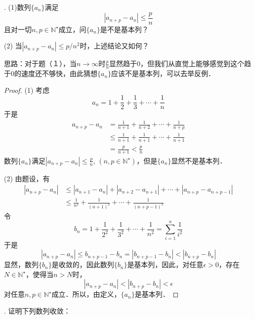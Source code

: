 \documentclass{ctexart}
\theoremstyle{definition}
\theoremstyle{definition}
\theoremstyle{plain}
\theoremstyle{plain}
\theoremstyle{plain}
\theoremstyle{definition}
\begin{document}
. (1)数列$\{a_n\}$满足
\begin{equation}
    |a_{n+p}-a_n|\leq\frac{p}{n}
\end{equation}
且对一切$n,p\in\mathbb{N}^\star$成立，问$\{ a_n\}$是不是基本列？

\noindent (2) 当$|a_{n+p} - a_n| \leq p/n^2$时，上述结论又如何？

\noindent 思路：对于题（１），当$n\to\infty$时$\displaystyle\frac{p}{n}$显然趋于$0$，但我们从直觉上能够感觉到这个趋于$0$的速度还不够快，由此猜想$\{a_n\}$应该不是基本列，可以去举反例．
\begin{proof}
(1) 考虑
\begin{equation}
    a_n = 1 + \frac{1}{2} + \frac{1}{3} + \cdots + \frac{1}{n} 
\end{equation}
于是
\begin{align}
    a_{n+p} - a_n &= \frac{1}{n+1} + \frac{1}{n+2} + \cdots + \frac{1}{n+p}\\
    &\leq \frac{1}{n+1} + \frac{1}{n+1} + \cdots + \frac{1}{n+1} \\
    &= \frac{p}{n+1} < \frac{p}{n}
\end{align}
数列$\{a_n\}$满足$|a_{n+p}-a_n|\leq \displaystyle\frac{p}{n}, \, (n,p\in\mathbb{N}^\star)$，但是$\{a_n\}$显然不是基本列．

\noindent (2) 由题设，有
\begin{align}
    |a_{n+p} - a_n| &\leq |a_{n+1} - a_n| + |a_{n+2} - a_{n+1}| + \cdots + |a_{n+p} - a_{n+p-1}| \\
    &\leq \frac{1}{n^2} + \frac{1}{(n+1)^2} + \cdots + \frac{1}{(n+p-1)^2}
\end{align}
令
\begin{equation}
    b_n = 1 + \frac{1}{2^2} + \frac{1}{3^2} + \cdots + \frac{1}{n^2} = \sum_{i=1}^n \frac{1}{i^2}
\end{equation}
于是
\begin{equation}
    |a_{n+p} - a_n| \leq b_{n+p-1} - b_n = |b_{n+p-1} - b_n| < |b_{n+p} - b_n|
\end{equation}
显然，数列$\{b_n\}$是收敛的，因此数列$\{ b_n \}$是基本列，因此，对任意$\epsilon > 0$，存在$N \in \mathbb{N}^\star$，使得当$n > N$时，
\begin{equation}
    |a_{n+p} - a_n| < |b_{n+p} - b_n| < \epsilon
\end{equation}
对任意$n, p \in \mathbb{N}^\star$成立．所以，由定义，$\{ a_n \}$是基本列．
\end{proof}

. 证明下列数列收敛：
\end{document}
